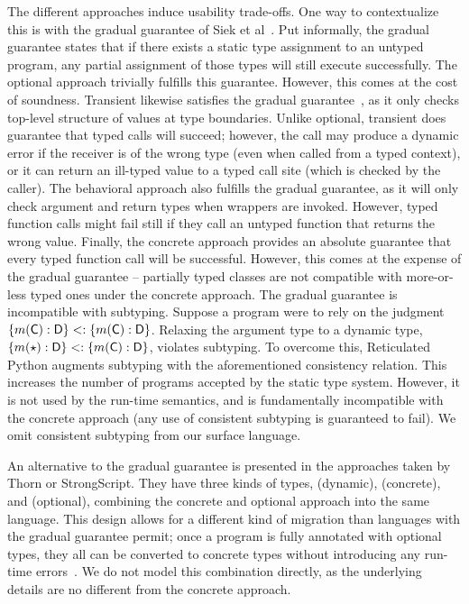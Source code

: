 \documentclass[USenglish]{tex/lipics-v2016}f
\begin{document}
The different approaches induce usability trade-offs. One way to
contextualize this is with the gradual guarantee of Siek et
al~\cite{GradualGuarantee}. Put informally, the gradual guarantee states
that if there exists a static type assignment to an untyped program, any
partial assignment of those types will still execute successfully. The
optional approach trivially fulfills this guarantee.  However, this comes at
the cost of soundness. Transient likewise satisfies the gradual
guarantee~\cite{Vitousek2017}, as it only checks top-level structure of
values at type boundaries. Unlike optional, transient does guarantee that
typed calls will succeed; however, the call may produce a dynamic error if
the receiver is of the wrong type (even when called from a typed context),
or it can return an ill-typed value to a typed call site (which is checked
by the caller). The behavioral approach also fulfills the gradual guarantee,
as it will only check argument and return types when wrappers are
invoked. However, typed function calls might fail still if they call an
untyped function that returns the wrong value. Finally, the concrete
approach provides an absolute guarantee that every typed function call will
be successful. However, this comes at the expense of the gradual guarantee
-- partially typed classes are not compatible with more-or-less typed ones
under the concrete approach.  The gradual guarantee is incompatible with
subtyping. Suppose a program were to rely on the judgment $\{m(\C):\D\} <:
\{m(\C):\D\}$.  Relaxing the argument type to a dynamic type,
$\{m(\any):\D\} <: \{m(\C):\D\}$, violates subtyping.  To overcome this,
Reticulated Python augments subtyping with the aforementioned consistency
relation. This increases the number of programs accepted by the static type
system. However, it is not used by the run-time semantics, and is
fundamentally incompatible with the concrete approach (any use of consistent
subtyping is guaranteed to fail).  We omit consistent subtyping from our
surface language.

An alternative to the gradual guarantee is presented in the approaches
taken by Thorn or StrongScript. They have three kinds of types, \any (dynamic),
\C (concrete), and  \C (optional), combining the concrete and
optional approach into the same language. This design allows for a different
kind of migration than languages with the gradual guarantee permit; once
a program is fully annotated with optional types, they all can be
converted to concrete types without introducing any run-time errors~\cite{ecoop15}.
We do not model this combination directly, as the underlying details
are no different from the concrete approach.
\end{document}
